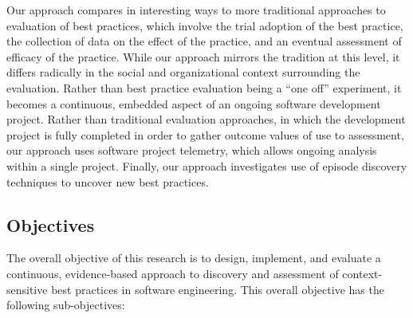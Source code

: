 Our approach compares in interesting ways to more traditional approaches to
evaluation of best practices, which involve the trial adoption of the best
practice, the collection of data on the effect of the practice, and an
eventual assessment of efficacy of the practice.  While our approach
mirrors the tradition at this level, it differs radically in the social and
organizational context surrounding the evaluation.  Rather than best
practice evaluation being a ``one off'' experiment, it becomes a
continuous, embedded aspect of an ongoing software development project.
Rather than traditional evaluation approaches, in which the development
project is fully completed in order to gather outcome values of use to
assessment, our approach uses software project telemetry, which allows
ongoing analysis within a single project.  Finally, our approach
investigates use of episode discovery techniques to uncover new best
practices.  

\subsection{Objectives}

The overall objective of this research is to design, implement, and
evaluate a continuous, evidence-based approach to discovery and assessment
of context-sensitive best practices in software engineering.
This overall objective has the following sub-objectives:

